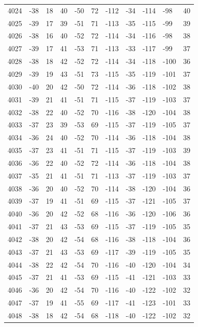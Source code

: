\begin{table}[H]
\begin{tabular}{lllllllllll}
4024 & -38 & 18 & 40 & -50 & 72 & -112 & -34 & -114 & -98 & 40 \\
4025 & -39 & 17 & 39 & -51 & 71 & -113 & -35 & -115 & -99 & 39 \\
4026 & -38 & 16 & 40 & -52 & 72 & -114 & -34 & -116 & -98 & 38 \\
4027 & -39 & 17 & 41 & -53 & 71 & -113 & -33 & -117 & -99 & 37 \\
4028 & -38 & 18 & 42 & -52 & 72 & -114 & -34 & -118 & -100 & 36 \\
4029 & -39 & 19 & 43 & -51 & 73 & -115 & -35 & -119 & -101 & 37 \\
4030 & -40 & 20 & 42 & -50 & 72 & -114 & -36 & -118 & -102 & 38 \\
4031 & -39 & 21 & 41 & -51 & 71 & -115 & -37 & -119 & -103 & 37 \\
4032 & -38 & 22 & 40 & -52 & 70 & -116 & -38 & -120 & -104 & 38 \\
4033 & -37 & 23 & 39 & -53 & 69 & -115 & -37 & -119 & -105 & 37 \\
4034 & -36 & 24 & 40 & -52 & 70 & -114 & -36 & -118 & -104 & 38 \\
4035 & -37 & 23 & 41 & -51 & 71 & -115 & -37 & -119 & -103 & 39 \\
4036 & -36 & 22 & 40 & -52 & 72 & -114 & -36 & -118 & -104 & 38 \\
4037 & -35 & 21 & 41 & -51 & 71 & -113 & -37 & -119 & -103 & 37 \\
4038 & -36 & 20 & 40 & -52 & 70 & -114 & -38 & -120 & -104 & 36 \\
4039 & -37 & 19 & 41 & -51 & 69 & -115 & -37 & -121 & -105 & 37 \\
4040 & -36 & 20 & 42 & -52 & 68 & -116 & -36 & -120 & -106 & 36 \\
4041 & -37 & 21 & 43 & -53 & 69 & -115 & -37 & -119 & -105 & 35 \\
4042 & -38 & 20 & 42 & -54 & 68 & -116 & -38 & -118 & -104 & 36 \\
4043 & -37 & 21 & 43 & -53 & 69 & -117 & -39 & -119 & -105 & 35 \\
4044 & -38 & 22 & 42 & -54 & 70 & -116 & -40 & -120 & -104 & 34 \\
4045 & -37 & 21 & 41 & -53 & 69 & -115 & -41 & -121 & -103 & 33 \\
4046 & -36 & 20 & 42 & -54 & 70 & -116 & -40 & -122 & -102 & 32 \\
4047 & -37 & 19 & 41 & -55 & 69 & -117 & -41 & -123 & -101 & 33 \\
4048 & -38 & 18 & 42 & -54 & 68 & -118 & -40 & -122 & -102 & 32 \\

\end{tabular}
\end{table}
